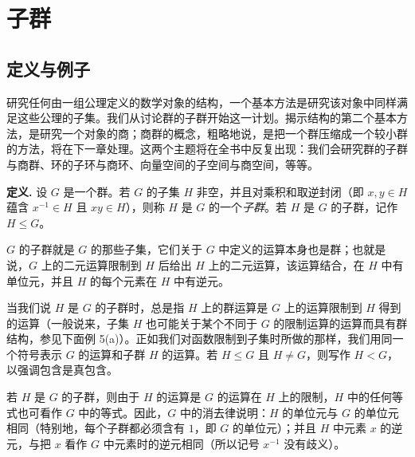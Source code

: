 \chapter{子群}

\section{定义与例子}

研究任何由一组公理定义的数学对象的结构，一个基本方法是研究该对象中同样满足这些公理的子集。我们从讨论群的子群开始这一计划。揭示结构的第二个基本方法，是研究一个对象的商；商群的概念，粗略地说，是把一个群压缩成一个较小群的方法，将在下一章处理。这两个主题将在全书中反复出现：我们会研究群的子群与商群、环的子环与商环、向量空间的子空间与商空间，等等。

\noindent\textbf{定义.} 设 $G$ 是一个群。若 $G$ 的子集 $H$ 非空，并且对乘积和取逆封闭（即 $x,y\in H$ 蕴含 $x^{-1}\in H$ 且 $xy\in H$），则称 $H$ 是 $G$ 的一个\emph{子群}。若 $H$ 是 $G$ 的子群，记作 $H\leq G$。

$G$ 的子群就是 $G$ 的那些子集，它们关于 $G$ 中定义的运算本身也是群；也就是说，$G$ 上的二元运算限制到 $H$ 后给出 $H$ 上的二元运算，该运算结合，在 $H$ 中有单位元，并且 $H$ 的每个元素在 $H$ 中有逆元。

当我们说 $H$ 是 $G$ 的子群时，总是指 $H$ 上的群运算是 $G$ 上的运算限制到 $H$ 得到的运算（一般说来，子集 $H$ 也可能关于某个不同于 $G$ 的限制运算的运算而具有群结构，参见下面例 5(a)）。正如我们对函数限制到子集时所做的那样，我们用同一个符号表示 $G$ 的运算和子群 $H$ 的运算。若 $H\leq G$ 且 $H\neq G$，则写作 $H<G$，以强调包含是真包含。

若 $H$ 是 $G$ 的子群，则由于 $H$ 的运算是 $G$ 的运算在 $H$ 上的限制，$H$ 中的任何等式也可看作 $G$ 中的等式。因此，$G$ 中的消去律说明：$H$ 的单位元与 $G$ 的单位元相同（特别地，每个子群都必须含有 $1$，即 $G$ 的单位元）；并且 $H$ 中元素 $x$ 的逆元，与把 $x$ 看作 $G$ 中元素时的逆元相同（所以记号 $x^{-1}$ 没有歧义）。


